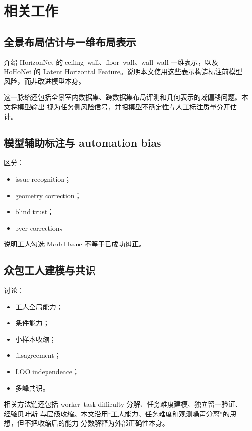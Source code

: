 \section{相关工作}

\subsection{全景布局估计与一维布局表示}

介绍 HorizonNet 的 ceiling--wall、floor--wall、wall--wall 一维表示，以及 HoHoNet 的 Latent Horizontal Feature。说明本文使用这些表示构造标注前模型风险，而非改进模型本身。

这一脉络还包括全景室内数据集、跨数据集布局评测和几何表示的域偏移问题。本文将模型输出
视为任务侧风险信号，并把模型不确定性与人工标注质量分开估计。

\subsection{模型辅助标注与 automation bias}

区分：

\begin{itemize}
  \item issue recognition；
  \item geometry correction；
  \item blind trust；
  \item over-correction。
\end{itemize}

说明工人勾选 Model Issue 不等于已成功纠正。

\subsection{众包工人建模与共识}

讨论：

\begin{itemize}
  \item 工人全局能力；
  \item 条件能力；
  \item 小样本收缩；
  \item disagreement；
  \item LOO independence；
  \item 多峰共识。
\end{itemize}

相关方法链还包括 worker--task difficulty 分解、任务难度建模、独立留一验证、经验贝叶斯
与层级收缩。本文沿用“工人能力、任务难度和观测噪声分离”的思想，但不把收缩后的能力
分数解释为外部正确性本身。

